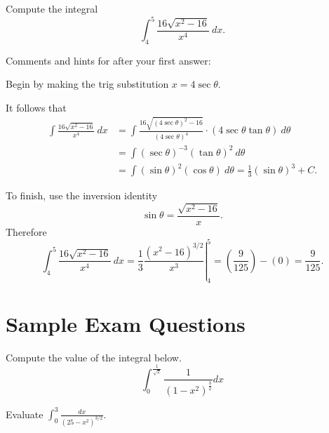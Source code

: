 \documentclass{ximera}
\begin{document}
\begin{question}%

Compute the integral 
\[\int_{4}^{5}\frac{16\sqrt{x^2-16}}{x^{4}}~dx.\]
\begin{multiplechoice}
\end{multiplechoice}
Comments and hints for after your first answer:
\begin{feedback}
Begin by making the trig substitution \(x=4\sec \theta\). \begin{hint} It follows that 
\[ \begin{aligned} \int\frac{16\sqrt{x^2-16}}{x^{4}}~dx & = \int \frac{16\sqrt{(4\sec \theta)^2-16}}{(4\sec \theta)^{4}} \cdot (4\sec \theta\tan \theta)~d \theta \\
 & = \int (\sec \theta)^{-3}(\tan \theta)^{2}~d \theta \\ & = \int (\sin \theta)^{2}(\cos \theta) ~ d \theta = \frac{1}{3}(\sin \theta)^{3} + C. \end{aligned} \] \begin{hint}
To finish, use the inversion identity \[\sin \theta = \frac{\sqrt{x^2-16}}{x}.\]
Therefore \[\int_{4}^{5}\frac{16\sqrt{x^2-16}}{x^{4}}~dx = \left.\frac{1}{3}\frac{(x^2-16)^{3/2}}{x^{3}}\right|_{4}^{5} = \left(\frac{9}{125}\right) - \left(0\right) = \frac{9}{125}.\] \end{hint} \end{hint}
\end{feedback}

\end{question}



\section*{Sample Exam Questions}

\begin{question}%

Compute the value of the integral below.
\[ \int_0^{\frac{1}{\sqrt{2}}} \frac{1}{(1-x^2)^{\frac{3}{2}}} dx \]
\begin{multiplechoice}
\end{multiplechoice}

\end{question}

\begin{question}%

Evaluate \(\displaystyle \int_0^3 \frac{dx}{(25-x^2)^{3/2}}\).
\begin{multiplechoice}
\end{multiplechoice}

\end{question}
\end{document}
